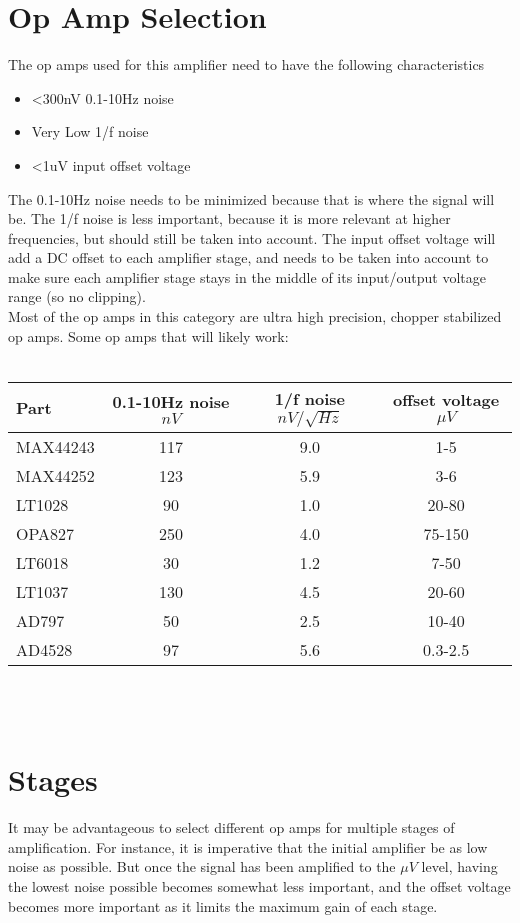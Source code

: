 \documentclass{article}
\begin{document}
\section{Op Amp Selection}
The op amps used for this amplifier need to have the following characteristics
\begin{itemize}
    \item \textless300nV 0.1-10Hz noise
    \item Very Low 1/f noise
    \item \textless1uV input offset voltage
\end{itemize}
The 0.1-10Hz noise needs to be minimized because that is where the signal will
be. The 1/f noise is less important, because it is more relevant at higher
frequencies, but should still be taken into account. The input offset voltage
will add a DC offset to each amplifier stage, and needs to be taken into
account to make sure each amplifier stage stays in the middle of its
input/output voltage range (so no clipping). \\ 
Most of the op amps in this category are ultra high precision, chopper
stabilized op amps. Some op amps that will likely work:\\ \\
\begin{tabular}{|l|c|c|c|}
    \hline
    Part & 0.1-10Hz noise $nV$ & 1/f noise $nV/\sqrt{Hz}$ & offset voltage $\mu V$ \\\hline
    MAX44243 & 117 & 9.0 & 1-5 \\\hline
    MAX44252 & 123 & 5.9 & 3-6 \\ \hline
    LT1028   & 90  & 1.0 & 20-80 \\ \hline
    OPA827   & 250 & 4.0 & 75-150 \\ \hline
    LT6018   & 30  & 1.2 & 7-50 \\ \hline
    LT1037   & 130 & 4.5 & 20-60 \\ \hline
    AD797    & 50  & 2.5 & 10-40 \\ \hline
    AD4528   & 97  & 5.6 & 0.3-2.5 \\ \hline
\end{tabular}\\ \\

\section{Stages}
It may be advantageous to select different op amps for multiple stages of
amplification. For instance, it is imperative that the initial amplifier be as
low noise as possible. But once the signal has been amplified to the $\mu V$
level, having the lowest noise possible becomes somewhat less important, and
the offset voltage becomes more important as it limits the maximum gain of each
stage. 
\end{document}
